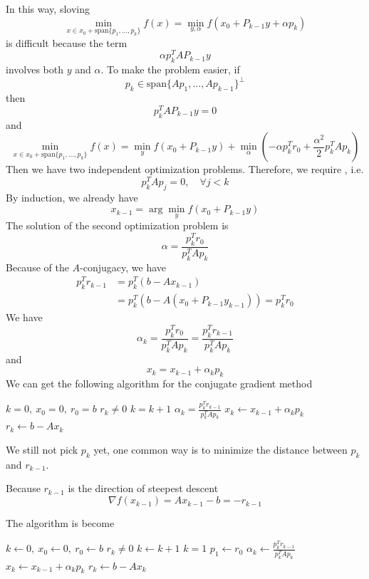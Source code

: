 In this way, sloving \[
    \min_{x \in x_0 + \text{span}\{p_1, \ldots, p_k\}} f(x) = \min_{y, \alpha} f(x_0 + P_{k-1} y + \alpha p_k)
\]
is difficult because the term \[
    \alpha p_k^T A P_{k-1} y
\]
involves both $y$ and $\alpha$.
To make the problem easier, if \[
    p_k \in \mbox{span}\{Ap_1, \ldots, Ap_{k-1}\}^\perp
\]
then \[
    p_k^T A P_{k-1} y = 0
\]
and \[
    \min_{x \in x_0 + \text{span}\{p_1, \ldots, p_k\}} f(x) = \min_{y} f(x_0 + P_{k-1} y) + \min_{\alpha} 
    (- \alpha p_k^T r_0 + \frac{\alpha^2}{2} p_k^T A p_k)
\]
Then we have two independent optimization problems. Therefore, we require , i.e. \[
    p_k^T A p_j = 0, \quad \forall j < k
\]
By induction, we already have \[
    x_{k-1} = \arg \min_{y} f(x_0 + P_{k-1} y)
\]
The solution of the second optimization problem is \[
    \alpha = \frac{p_k^T r_0}{p_k^T A p_k}
\]
\newpage
Because of the $A$-conjugacy, we have \begin{align*}
    p_k^T r_{k-1} &= p_k^T (b - A x_{k-1}) \\
    &= p_k^T (b - A(x_0 + P_{k-1} y_{k-1})) = p_k^T r_0
\end{align*}
We have \[
    \alpha_k = \frac{p_k^T r_0}{p_k^T A p_k} = \frac{p_k^T r_{k-1}}{p_k^T A p_k}
\]
and \[
    x_k = x_{k-1} + \alpha_k p_k
\]
We can get the following algorithm for the conjugate gradient method
\begin{codebox}
\li $k = 0,\ x_0 = 0,\ r_0 = b$
\li \While $r_k \neq 0$
\Do
\li $k = k + 1$
\li {}
\li $\alpha_k = \frac{p_k^T r_{k-1}}{p_k^T A p_k}$
\li $x_k \leftarrow x_{k-1} + \alpha_k p_k$
\li $r_k \leftarrow b - A x_k$
\End
\end{codebox}

We still not pick $p_k$ yet, one common way is to minimize the distance between $p_k$ and $r_{k-1}$.

\begin{note}
    Because $r_{k-1}$ is the direction of steepest descent \[
        \nabla f(x_{k-1}) = A x_{k-1} - b = - r_{k-1}
    \]
\end{note}

The algorithm is become 
\begin{codebox}
\li $k \gets 0,\ x_0 \gets 0,\ r_0 \gets b$
\li \While $r_k \neq 0$ \Do
\li     $k \gets k + 1$
\li     \If $k = 1$ \Then
\li         $p_1 \gets r_0$
\li     \Else
\li         {}
\End
\li     $\alpha_k \gets \frac{p_k^T r_{k-1}}{p_k^T A p_k}$
\li     $x_k \gets x_{k-1} + \alpha_k p_k$
\li     $r_k \gets b - A x_k$
\End
\end{codebox}

